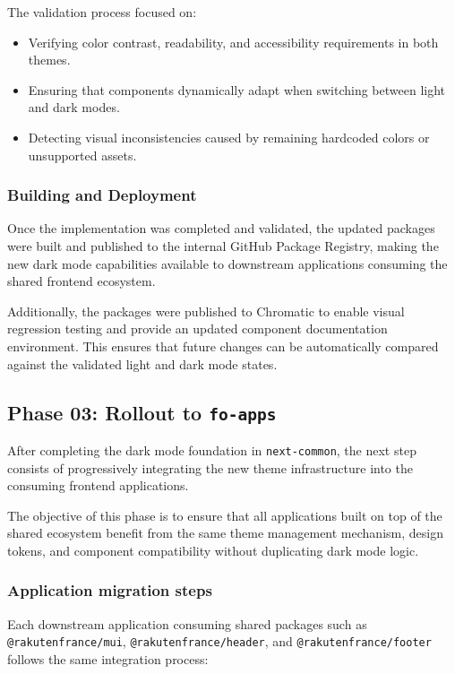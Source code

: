 The validation process focused on:

\begin{itemize}
    \item Verifying color contrast, readability, and accessibility requirements in both themes.
    \item Ensuring that components dynamically adapt when switching between light and dark modes.
    \item Detecting visual inconsistencies caused by remaining hardcoded colors or unsupported assets.
\end{itemize}

\subsubsection{Building and Deployment}

Once the implementation was completed and validated, the updated packages were built and published to the internal GitHub Package Registry, making the new dark mode capabilities available to downstream applications consuming the shared frontend ecosystem.

Additionally, the packages were published to Chromatic to enable visual regression testing and provide an updated component documentation environment. This ensures that future changes can be automatically compared against the validated light and dark mode states.

\subsection{Phase 03: Rollout to \texttt{fo-apps}}

After completing the dark mode foundation in \texttt{next-common}, the next step consists of progressively integrating the new theme infrastructure into the consuming frontend applications.

The objective of this phase is to ensure that all applications built on top of the shared ecosystem benefit from the same theme management mechanism, design tokens, and component compatibility without duplicating dark mode logic.

\subsubsection{Application migration steps}

Each downstream application consuming shared packages such as \texttt{@rakutenfrance/mui}, \texttt{@rakutenfrance/header}, and \texttt{@rakutenfrance/footer} follows the same integration process:

